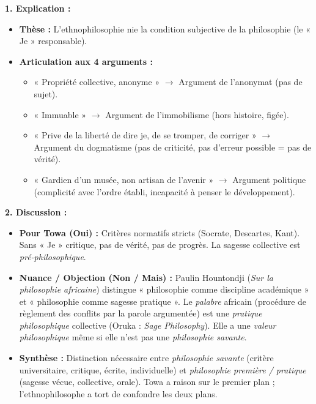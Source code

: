 \documentclass[11pt]{article}
\begin{document}
\begin{corrige}
\textbf{1. Explication :}
\begin{itemize}
    \item \textbf{Thèse :} L'ethnophilosophie nie la condition subjective de la philosophie (le « Je » responsable).
    \item \textbf{Articulation aux 4 arguments :}
    \begin{itemize}
        \item « Propriété collective, anonyme » $\rightarrow$ Argument de l'anonymat (pas de sujet).
        \item « Immuable » $\rightarrow$ Argument de l'immobilisme (hors histoire, figée).
        \item « Prive de la liberté de dire je, de se tromper, de corriger » $\rightarrow$ Argument du dogmatisme (pas de criticité, pas d'erreur possible = pas de vérité).
        \item « Gardien d'un musée, non artisan de l'avenir » $\rightarrow$ Argument politique (complicité avec l'ordre établi, incapacité à penser le développement).
    \end{itemize}
\end{itemize}
\textbf{2. Discussion :}
\begin{itemize}
    \item \textbf{Pour Towa (Oui) :} Critères normatifs stricts (Socrate, Descartes, Kant). Sans « Je » critique, pas de vérité, pas de progrès. La sagesse collective est \emph{pré-philosophique}.
    \item \textbf{Nuance / Objection (Non / Mais) :} Paulin Hountondji (\emph{Sur la philosophie africaine}) distingue « philosophie comme discipline académique » et « philosophie comme sagesse pratique ». Le \emph{palabre} africain (procédure de règlement des conflits par la parole argumentée) est une \emph{pratique philosophique} collective (Oruka : \emph{Sage Philosophy}). Elle a une \emph{valeur philosophique} même si elle n'est pas une \emph{philosophie savante}.
    \item \textbf{Synthèse :} Distinction nécessaire entre \emph{philosophie savante} (critère universitaire, critique, écrite, individuelle) et \emph{philosophie première / pratique} (sagesse vécue, collective, orale). Towa a raison sur le premier plan ; l'ethnophilosophe a tort de confondre les deux plans.
\end{itemize}
\end{corrige}
\end{document}
